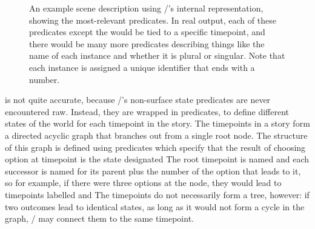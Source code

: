 \begin{figure}[!b]
\centering
{}
\caption[\dunyazad/ state example]{An example scene description using \dunyazad/'s internal representation, showing the most-relevant predicates. In real output, each of these predicates except the  would be tied to a specific timepoint, and there would be many more  predicates describing things like the name of each instance and whether it is plural or singular. Note that each instance is assigned a unique identifier that ends with a number.}
\label{fig:dunyazad-state-example}
\end{figure}


 is not quite accurate, because \dunyazad/'s non-surface state predicates are never encountered raw.
%
Instead, they are wrapped in  predicates, to define different states of the world for each timepoint in the story.
%
The timepoints in a story form a directed acyclic graph that branches out from a single root node.
%
The structure of this graph is defined using  predicates which specify that the result of choosing option  at timepoint  is the state designated 
%
The root timepoint is named  and each successor is named for its parent plus the number of the option that leads to it, so for example, if there were three options at the  node, they would lead to timepoints labelled   and 
%
The timepoints do not necessarily form a tree, however: if two outcomes lead to identical states, as long as it would not form a cycle in the graph, \dunyazad/ may connect them to the same timepoint.


